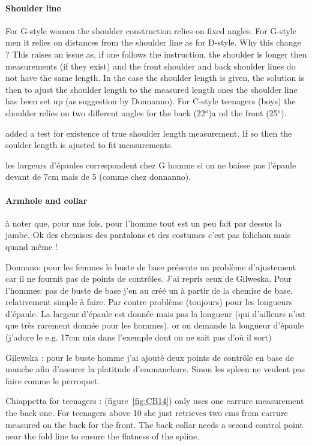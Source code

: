 \documentclass[11pt,a4paper]{article}
\begin{document}
\paragraph{Shoulder line} 

For G-style women the shoulder construction relies on fixed angles. For G-style men it relies on distances from the shoulder line as for D-style. Why  this change ? This raises an issue as, if one follows the instruction, the shoulder is longer then measurements (if they exist) and the front shoulder and back shoulder lines do not have the same length. In the case the shoulder length is given, the solution is then to ajust the shoulder length to the measured length ones the shoulder line has been set up (as suggestion by Donnanno).
For C-style teenagers (boys) the shoulder relies on two different angles for the back (22$^o$)a nd the front (25$^o$). 

added a test for existence of true shoulder length measurement. If so then the soulder length is ajusted to fit measurements.

les largeurs d'épaules correspondent chez G homme si on ne baisse pas l'épaule devant de 7cm mais de 5 (comme chez donnanno).

\paragraph{Armhole and collar}

à noter que, pour une fois, pour l'homme tout est un peu fait par dessus 
la jambe. Ok des chemises des pantalons et des costumes c'est pas 
folichon mais quand même !

Donnano:  pour les femmes le buste de base présente un problème d'ajustement car il ne 
fournit pas de points de contrôles. J'ai repris ceux de Gilweska. 
Pour l'hommes: pas de buste de base j'en au  créé un à partir de la chemise de base. 
relativement simple à faire. Par contre problème (toujours) pour les 
longueurs d'épaule. La largeur d'épaule est donnée mais pas la 
longueur (qui d'ailleurs n'est que très rarement donnée pour les 
hommes). or on demande la longueur d'épaule (j'adore le e.g. 17cm mis 
dans l'exemple dont on ne sait pas d'où il sort) 

Gilewska : pour le buste homme j'ai ajouté  deux points de contrôle 
en base de manche  afin d'assurer la platitude d'emmanchure. Sinon les 
spleen ne veulent pas faire comme le perroquet.


Chiappetta for teenagers :  (figure~\ref{fig:CB14}) only uses one carrure measurement the back one. For teenagers above 10 she just retrieves two cms from  carrure measured on the back for the front. The back collar needs a second control point near the fold line to ensure the flatness of the spline.
\end{document}
